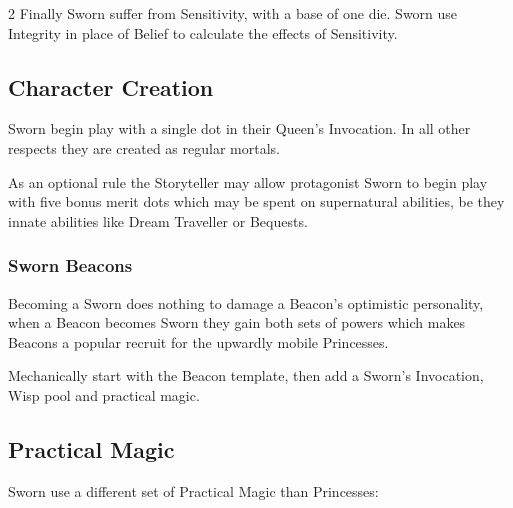\begin{multicols}{2}
Finally Sworn suffer from Sensitivity, with a base of one die. Sworn use Integrity in place of Belief to calculate the effects of Sensitivity.

\subsection*{Character Creation}

Sworn begin play with a single dot in their Queen's Invocation. In all other respects they are created as regular mortals. 

As an optional rule the Storyteller may allow protagonist Sworn to begin play with five bonus merit dots which may be spent on supernatural abilities, be they innate abilities like Dream Traveller or Bequests.


\begin{mybox}

\subsubsection*{Sworn Beacons}

Becoming a Sworn does nothing to damage a Beacon's optimistic personality, when a Beacon becomes Sworn they gain both sets of powers which makes Beacons a popular recruit for the upwardly mobile Princesses. 

Mechanically start with the Beacon template, then add a Sworn's Invocation, Wisp pool and practical magic. 

\end{mybox}


\subsection*{Practical Magic}

Sworn use a different set of Practical Magic than Princesses: 


\end{multicols}
